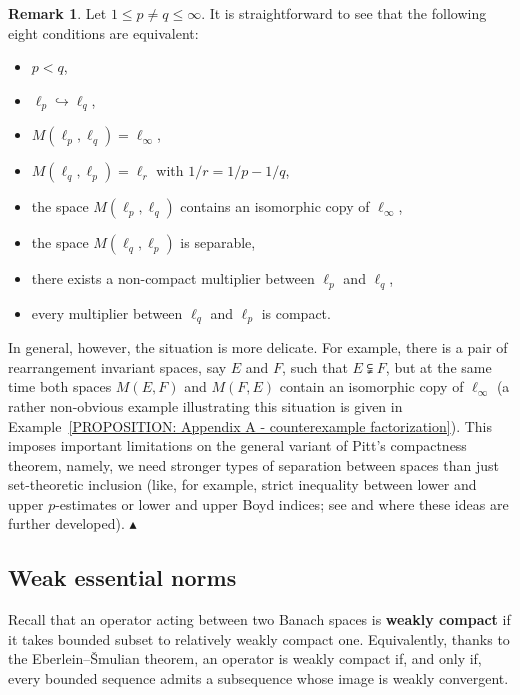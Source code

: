 \documentclass[11pt]{amsart}
\theoremstyle{definition}
\theoremstyle{definition}
\theoremstyle{definition}
\theoremstyle{definition}
\theoremstyle{definition}
\theoremstyle{definition}
\newtheorem{remark}[theorem]{Remark}
\theoremstyle{definition}
\theoremstyle{definition}
\numberwithin{equation}{section}
\numberwithin{equation}{section}
\numberwithin{equation}{section}
\theoremstyle{definition}
\theoremstyle{definition}
\theoremstyle{definition}
\theoremstyle{definition}
\theoremstyle{definition}
\theoremstyle{definition}
\newcommand\xqed[1]{%
	\leavevmode\unskip\penalty9999 \hbox{}\nobreak\hfill
	\quad\hbox{#1}}
\newcommand\demo{\xqed{{\Large $\blacktriangle$}}}
\begin{document}
	\begin{remark} \label{REMARK: general Pitt}
		Let $1 \leqslant p \neq q \leqslant \infty$.
		It is straightforward to see that the following eight conditions are equivalent:
		\begin{itemize}
			\item[$\bullet$] $p < q$,
			\item[$\bullet$] $\ell_p \hookrightarrow \ell_q$,
			\item[$\bullet$] $M(\ell_p,\ell_q) = \ell_{\infty}$,
			\item[$\bullet$] $M(\ell_q,\ell_p) = \ell_{r}$ with $1/r = 1/p - 1/q$,
			\item[$\bullet$] the space $M(\ell_p,\ell_q)$ contains an isomorphic copy of $\ell_{\infty}$,
			\item[$\bullet$] the space $M(\ell_q,\ell_p)$ is separable,
			\item[$\bullet$] there exists a non-compact multiplier between $\ell_p$ and $\ell_q$,
			\item[$\bullet$] every multiplier between $\ell_q$ and $\ell_p$ is compact.
		\end{itemize}
		
		In general, however, the situation is more delicate.
		For example, there is a pair of rearrangement invariant spaces, say $E$ and $F$, such that $E \subsetneqq F$,
		but at the same time both spaces $M(E,F)$ and $M(F,E)$ contain an isomorphic copy of $\ell_{\infty}$ (a rather non-obvious example illustrating
		this situation is given in Example~\ref{PROPOSITION: Appendix A - counterexample factorization}).
		This imposes important limitations on the general variant of Pitt's compactness theorem, namely,
		we need stronger types of separation between spaces than just set-theoretic inclusion (like, for example,
		strict inequality between lower and upper $p$-estimates or lower and upper Boyd indices;
		see \cite{DLMR00} and \cite[pp.~138--139]{LT77} where these ideas are further developed).
		\demo
	\end{remark}

\subsection{Weak essential norms}
Recall that an operator acting between two Banach spaces is {\bf weakly compact} if it takes bounded subset to relatively weakly compact one.
Equivalently, thanks to the Eberlein--{\v S}mulian theorem, an operator is weakly compact if, and only if, every bounded sequence admits a subsequence
whose image is weakly convergent.
\end{document}
